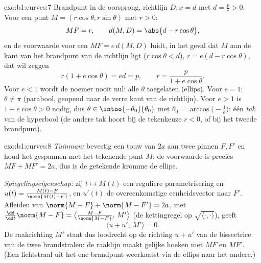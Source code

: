 \begin{solution}{exo:b1:curves:7}
Brandpunt in de oorsprong, richtlijn $D: x = d$ met $d = \frac pe >
0$. Voor een punt $M = (r\cos\theta, r\sin\theta)$ met $r > 0$:
\[
MF = r,
\qquad
d(M, D) = \abs{d - r\cos\theta},
\]
en de voorwaarde voor een  $MF = e\,d(M, D)$ luidt, in
het geval dat $M$ aan de kant van het brandpunt van de richtlijn
ligt ($r\cos\theta < d$), $r = e(d - r\cos\theta)$, dat wil zeggen
\[
r(1 + e\cos\theta) = ed = p,
\qquad
r = \frac{p}{1 + e\cos\theta} .
\]
Voor $e < 1$ wordt de noemer nooit nul: alle $\theta$ toegelaten
(ellips). Voor $e = 1$: $\theta \neq \pi$ (parabool, geopend naar de
verre kant van de richtlijn). Voor $e > 1$ is $1 + e\cos\theta > 0$
nodig, dus $\theta \in \intoo{-\theta_0}{\theta_0}$ met $\theta_0 =
\arccos\bigl(-\frac1e\bigr)$: één \emph{tak} van de hyperbool (de
andere tak hoort bij de tekenkeuze $r < 0$, of bij het tweede
brandpunt).
\end{solution}

\begin{solution}{exo:b1:curves:8}
\emph{Tuinman:} bevestig een touw van  $2a$ aan twee pinnen
$F, F'$ en houd het gespannen met het tekenende punt $M$: de
voorwaarde is precies $MF + MF' = 2a$, dus is de getekende kromme de
ellips.

\emph{Spiegelingseigenschap:} zij $t \mapsto M(t)$ een reguliere
parametrisering en $u(t) = \frac{M(t) - F}{\norm{M(t) - F}}$, en
$u'(t)$ de overeenkomstige eenheidsvector naar $F'$. Afleiden van
$\norm{M - F} + \norm{M - F'} = 2a$, met $\frac{\dd}{\dd t}\norm{M
- F} = \bigl\langle \frac{M - F}{\norm{M-F}},\, M'\bigr\rangle$ (de
kettingregel op $\sqrt{\langle\cdot,\cdot\rangle}$), geeft
\[
\bigl\langle u + u',\, M'\bigr\rangle = 0 .
\]
De raakrichting $M'$ staat dus loodrecht op de richting $u + u'$
van de bissectrice van de twee brandstralen: de raaklijn maakt
gelijke hoeken met $MF$ en $MF'$. (Een lichtstraal uit het ene
brandpunt weerkaatst via de ellips naar het andere.)
\end{solution}

